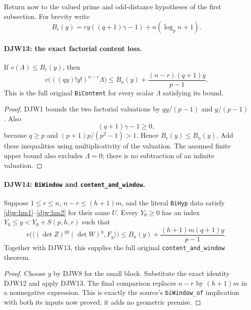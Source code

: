 \documentclass[11pt,a4paper]{article}
\numberwithin{equation}{section}
\theoremstyle{remark}\newtheorem{remark}[theorem]{Remark}
\begin{document}
Return now to the valued prime and odd-distance hypotheses of the
first subsection.  For brevity write
\[
 B_r(y)=ry((q+1)\gamma-1)+n(\log_p n+1).
\]

\paragraph{DJW13: the exact factorial content loss.}
\label{claim:DJW13}
If $v(\Lambda)\le B_r(y)$, then
\begin{equation}
 v\bigl(((qy)!y!)^{n-r}\Lambda\bigr)
       \le B_n(y)+\frac{(n-r)(q+1)y}{p-1}.
 \label{djw:content}
\end{equation}
This is the full original \texttt{Bi\allowbreak Content} for every scalar
$\Lambda$ satisfying its bound.

\begin{proof}
DJW1 bounds the two factorial valuations by $qy/(p-1)$ and
$y/(p-1)$.  Also
\[
 (q+1)\gamma-1\ge0,
\]
because $q\ge p$ and
$(p+1)p/(p^2-1)>1$.  Hence $B_r(y)\le B_n(y)$.
Add these inequalities using multiplicativity of the valuation.
The assumed finite upper bound also excludes $\Lambda=0$;
there is no subtraction of an infinite valuation.
\end{proof}

\paragraph{DJW14: \texttt{Bi\allowbreak Window} and \texttt{content\_\allowbreak and\_\allowbreak window}.}
\label{claim:DJW14}
Suppose $1\le r\le n$, $n-r\le(h+1)m$, and the literal
\texttt{Bi\allowbreak Hyp} data satisfy \eqref{djw:hm1}--\eqref{djw:hm2}
for their same $U$.  Every $Y_0\ge0$ has an index
$Y_0\le y<Y_0+S(p,h,r)$ such that
\begin{equation}
 v\bigl(\langle(\det Z)^{qy}(\det W)^y,F_y\rangle\bigr)
 \le B_n(y)+\frac{(h+1)m(q+1)y}{p-1}.
 \label{djw:biwindow}
\end{equation}
Together with DJW13, this supplies the full original
\texttt{content\_\allowbreak and\_\allowbreak window} theorem.

\begin{proof}
Choose $y$ by DJW8 for the small block.  Substitute the exact
identity DJW12 and apply DJW13.  The final comparison replaces
$n-r$ by $(h+1)m$ in a nonnegative expression.  This is exactly
the source's \texttt{bi\allowbreak Window\_\allowbreak of} implication with both its
inputs now proved; it adds no geometric premise.
\end{proof}
\end{document}
